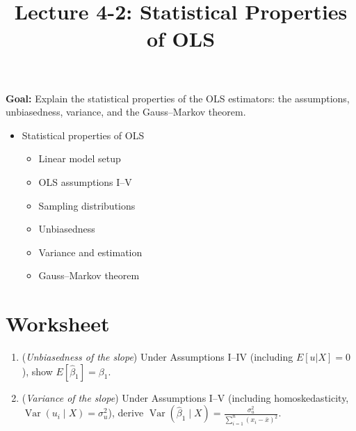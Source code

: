 \documentclass[12pt]{article}
\title{\Large Lecture 4-2: Statistical Properties of OLS}
\author{}
\date{}
\newcommand{\var}{\operatorname{Var}}
\begin{document}
\maketitle
\vspace{-6em}

\noindent \textbf{Goal:} Explain the statistical properties of the OLS estimators: the assumptions, unbiasedness, variance, and the Gauss–Markov theorem.\medskip

\begin{itemize}\setlength{\itemsep}{1em}
\item Statistical properties of OLS
\begin{itemize}
\item Linear model setup
\item OLS assumptions I–V
\item Sampling distributions
\item Unbiasedness
\item Variance and estimation
\item Gauss–Markov theorem
\end{itemize}
\end{itemize}


\clearpage


\section*{Worksheet}


\begin{enumerate}\itemsep20em
\item (\emph{Unbiasedness of the slope})  
Under Assumptions I--IV (including $E[u|X]=0$), show $E[\hat\beta_1]=\beta_1$.

\item (\emph{Variance of the slope})  
Under Assumptions I--V (including homoskedasticity, $\var(u_i\mid X)=\sigma_u^2$), derive $\displaystyle \var(\hat\beta_1\mid X)=\frac{\sigma_u^2}{\sum_{i=1}^n(x_i-\bar x)^2}$.

\end{enumerate}
\end{document}
